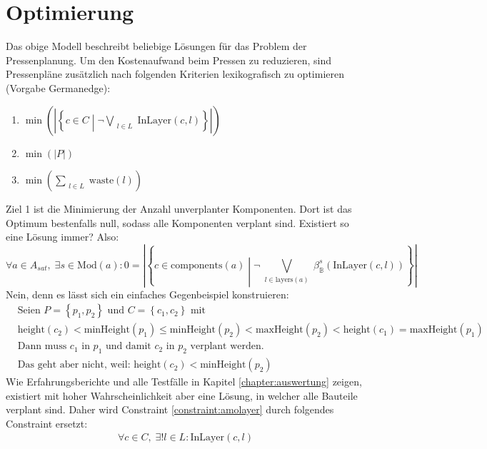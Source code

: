 \section{Optimierung}
\label{sec:optimierung}
Das obige Modell beschreibt beliebige Lösungen für das Problem der Pressenplanung.
Um den Kostenaufwand beim Pressen zu reduzieren, sind Pressenpläne zusätzlich nach folgenden Kriterien lexikografisch zu optimieren (Vorgabe Germanedge):
\begin{enumerate}
    \item $ \min \left( \left\lvert \left\{ c \in C \middle| \neg\bigvee\limits_{\substack{l \in L}} \text{InLayer}(c,l) \right\} \right\rvert \right) $
    \item $ \min (\lvert P \rvert) $
    \item $ \min \left(\sum\limits_{\substack{l \in L}} \text{waste}(l) \right) $
\end{enumerate}
Ziel 1 ist die Minimierung der Anzahl unverplanter Komponenten.
Dort ist das Optimum bestenfalls null, sodass alle Komponenten verplant sind.
Existiert so eine Lösung immer?
Also:
\[
    \forall a \in A_{sat}, \; \exists s \in \text{Mod}(a): 0 = \left\lvert \left\{ c \in \text{components}(a) \middle| \neg\bigvee\limits_{\substack{l \in \text{layers}(a)}} \beta_{\mathbb{B}}^{s}(\text{InLayer}(c,l)) \right\} \right\rvert
\]
Nein, denn es lässt sich ein einfaches Gegenbeispiel konstruieren:
\begin{align*}
    &\hspace{0pt} \text{Seien } P = \left\{ p_1, p_2 \right\} \text{ und } C = \left\{ c_1,c_2 \right\} \text{ mit } \\
    &\hspace{0pt} \text{height}(c_2) < \text{minHeight}(p_1) \leq \text{minHeight}(p_2) < \text{maxHeight}(p_2) < \text{height}(c_1) = \text{maxHeight}(p_1) \\
    &\hspace{0pt} \text{Dann muss } c_1 \text{ in } p_1 \text{ und damit } c_2 \text{ in } p_2 \text{ verplant werden.} \\
    &\hspace{0pt} \text{Das geht aber nicht, weil: } \text{height}(c_2) < \text{minHeight}(p_2)
\end{align*}
Wie Erfahrungsberichte und alle Testfälle in Kapitel \ref{chapter:auswertung} zeigen, existiert mit hoher Wahrscheinlichkeit aber eine Lösung, in welcher alle Bauteile verplant sind.
Daher wird Constraint \ref{constraint:amolayer} durch folgendes Constraint ersetzt:
\begin{align}
    \forall c \in C,\; \exists! l \in L: \text{InLayer}(c,l) \label{constraint:eoLayer}
\end{align}
